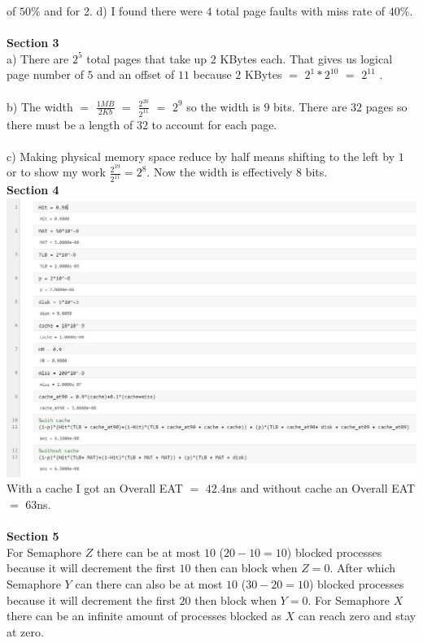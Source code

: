 \documentclass[12pt]{article}
\begin{document}
of $50\%$ and for 2. d) I found there were $4$ total page faults with miss rate 
of $40\%$. \\\\
\textbf{Section 3}\\
a) There are $2^5$ total pages that take up $2$ KBytes each. That gives us 
logical page number of $5$ and an offset of $11$ because $2$ KBytes $=$ $2^1*2^{10}$ 
$=$ $2^{11}$ .\\\\
b) The width $=$ $\frac{1MB}{2Kb}$ $=$ $\frac{2^{20}}{2^{11}}$ $=$ $2^9$ so the width is 
$9$ bits. There are $32$ pages so there must be a length of $32$ to account for each 
page.\\\\
c) Making physical memory space reduce by half means shifting to the left 
by $1$ or to show my work $\frac{2^{19}}{2^{11}} = 2^8$. Now the width is effectively 
$8$ bits.\\
\textbf{Section 4}\\
\includegraphics[scale = 0.5]{4.JPG}\\
With a cache I got an Overall EAT $=$ $42.4$ns and without cache an Overall EAT $=$ $63$ns.
\\\\
\textbf{Section 5}\\
For Semaphore $Z$ there can be at most $10$ ($20-10=10$) blocked processes because 
it will decrement the first $10$ then can block when $Z=0$. After which Semaphore 
$Y$ can there can also be at most $10$ ($30-20=10$) blocked 
processes because it will decrement the first $20$ then block when $Y=0$. For Semaphore 
$X$ there can be an infinite amount of processes blocked as $X$ can reach zero and stay 
at zero.
\end{document}
